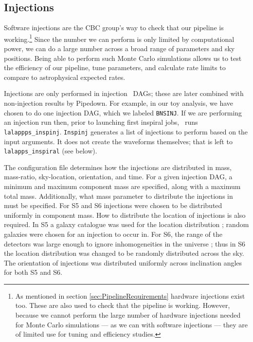 \subsection{Injections}
\label{sec:inspinj}

Software injections are the \ac{CBC} group's way to check that our pipeline is
working.\footnote{As mentioned in section \ref{sec:PipelineRequirements}
hardware injections exist too. These are also used to check that the pipeline
is working. However, because we cannot perform the large number of hardware
injections needed for Monte Carlo simulations --- as we can with software
injections --- they are of limited use for tuning and efficiency studies.}
Since the number we can perform is only limited by computational power, we can
do a large number across a broad range of parameters and sky positions. Being
able to perform such Monte Carlo simulations allows us to test the efficiency
of our pipeline, tune parameters, and calculate rate limits to compare to
astrophysical expected rates.

Injections are only performed in injection \hipe~\acp{DAG}; these are later
combined with non-injection results by Pipedown. For example, in our toy
analysis, we have chosen to do one injection \ac{DAG}, which we labeled
\texttt{BNSINJ}. If we are performing an injection run then, prior to launching
first inspiral jobs, \hipe~runs \texttt{lalappps\_inspinj}. \texttt{Inspinj}
generates a list of injections to perform based on the input arguments. It does
not create the waveforms themselves; that is left to \texttt{lalapps\_inspiral}
(see below).

The configuration file determines how the injections are distributed in mass,
mass-ratio, sky-location, orientation, and time. For a given injection
\ac{DAG}, a minimum and maximum component mass are specified, along with a
maximum total mass. Additionally, what mass parameter to distribute the
injections in must be specified. For \ac{S5} and \ac{S6} injections were chosen
to be distributed uniformly in component mass. How to distribute the location
of injections is also required. In \ac{S5} a galaxy catalogue was used for the
location distribution \cite{Collaboration:2009tt, Abbott:2009qj}; random
galaxies were chosen for an injection to occur in. For \ac{S6}, the range of
the detectors was large enough to ignore inhomogeneities in the universe
\cite{ratesdoc}; thus in \ac{S6} the location distribution was changed to be
randomly distributed across the sky. The orientation of injections was
distributed uniformly across inclination angles for both \ac{S5} and \ac{S6}.

